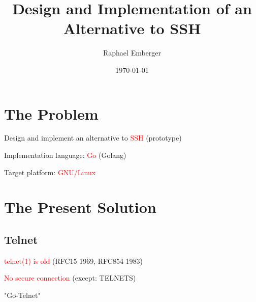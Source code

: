 \documentclass[
	xcolor=dvipsnames,
	handout
]{beamer}
\title{Design and Implementation of an Alternative to SSH}
\date{\today}
\author{Raphael Emberger}
\newenvironment{zhawframe}[1][]
{\begin{frame}[environment=fr,#1]{\insertsubsectionhead}{\insertsectionhead}}
{\end{frame}
}
\begin{document}
\maketitle


\section{The Problem}
\begin{zhawframe}
 Design and implement an alternative to \textcolor{red}{SSH} (prototype)

 Implementation language: \textcolor{red}{Go} (Golang)

 Target platform: \textcolor{red}{GNU/Linux}
\end{zhawframe}

\section{The Present Solution}
\subsection{Telnet}
\begin{zhawframe}
 \textcolor{red}{telnet(1) is old} (RFC15 1969, RFC854 1983)

 \textcolor{red}{No secure connection} (except: TELNETS)

 "Go-Telnet"
\end{zhawframe}
\end{document}
